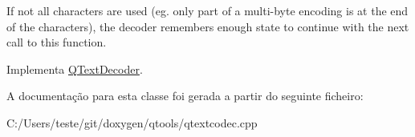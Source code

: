 If not all characters are used (eg. only part of a multi-\/byte encoding is at the end of the characters), the decoder remembers enough state to continue with the next call to this function. 

Implementa \hyperlink{class_q_text_decoder_a69f80ea56957b935500789ca12a5695b}{Q\-Text\-Decoder}.



A documentação para esta classe foi gerada a partir do seguinte ficheiro\-:\begin{DoxyCompactItemize}
\item 
C\-:/\-Users/teste/git/doxygen/qtools/qtextcodec.\-cpp\end{DoxyCompactItemize}
